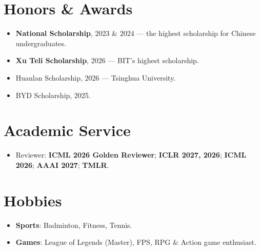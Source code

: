 \documentclass{resume}
\begin{document}
\section{Honors \& Awards}
\begin{itemize}[parsep=0.5ex]
  \item \textbf{National Scholarship}, 2023 \& 2024 --- the highest scholarship for Chinese undergraduates.
  \item \textbf{Xu Teli Scholarship}, 2026 --- BIT's highest scholarship.
  \item Huanlan Scholarship, 2026 --- Tsinghua University.
  \item BYD Scholarship, 2025.
\end{itemize}

\section{Academic Service}
\begin{itemize}[parsep=0.5ex]
  \item Reviewer: \textbf{ICML 2026 Golden Reviewer}; \textbf{ICLR 2027, 2026}; \textbf{ICML 2026}; \textbf{AAAI 2027}; \textbf{TMLR}.
\end{itemize}

\section{Hobbies}
\begin{itemize}[parsep=0.5ex]
  \item \textbf{Sports}: Badminton, Fitness, Tennis.
  \item \textbf{Games}: League of Legends (Master), FPS, RPG \& Action game enthusiast.
\end{itemize}
\end{document}
